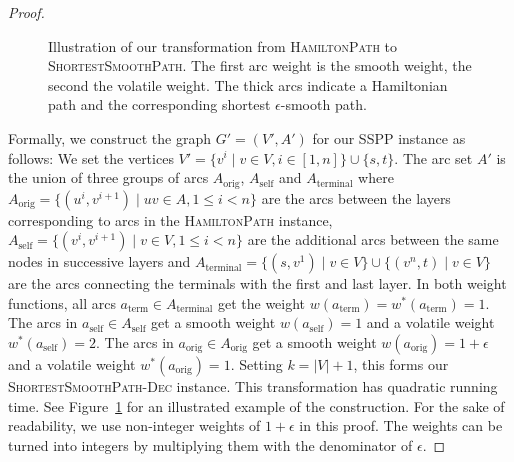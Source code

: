 \documentclass[a4paper,UKenglish,cleveref, autoref, thm-restate]{lipics-v2021}
\begin{document}
\begin{proof}
\begin{figure}
\caption{
Illustration of our transformation from \textsc{HamiltonPath} to \textsc{ShortestSmoothPath}.
The first arc weight is the smooth weight, the second the volatile weight.
The thick arcs indicate a Hamiltonian path and the corresponding shortest $\epsilon$-smooth path.
}
\label{fig:transformation}
\end{figure}

Formally, we construct the graph $G'=(V',A')$ for our SSPP instance as follows:
We set the vertices $V' = \{ v^i \mid v \in V, i \in [1,n] \} \cup \{s,t\}$.
The arc set $A'$ is the union of three groups of arcs $A_{\operatorname{orig}}$, $A_{\operatorname{self}}$ and $A_{\operatorname{terminal}}$ where $A_{\operatorname{orig}} = \{ (u^i, v^{i+1}) \mid uv \in A, 1 \leq i < n \}$ are the arcs between the layers corresponding to arcs in the \textsc{HamiltonPath} instance, $A_{\operatorname{self}} = \{ (v^i, v^{i+1}) \mid v \in V, 1 \leq i < n \}$ are the additional arcs between the same nodes in successive layers and $A_{\operatorname{terminal}} = \{ (s, v^1) \mid v \in V \} \cup \{ (v^n, t) \mid v \in V \}$ are the arcs connecting the terminals with the first and last layer.
In both weight functions, all arcs $a_{\operatorname{term}} \in A_{\operatorname{terminal}}$ get the weight $w(a_{\operatorname{term}}) = w^*(a_{\operatorname{term}}) = 1$.
The arcs in $a_{\operatorname{self}} \in A_{\operatorname{self}}$ get a smooth weight $w(a_{\operatorname{self}}) = 1$ and a volatile weight $w^*(a_{\operatorname{self}}) = 2$.
The arcs in $a_{\operatorname{orig}} \in A_{\operatorname{orig}}$ get a smooth weight $w(a_{\operatorname{orig}}) = 1+\epsilon$ and a volatile weight $w^*(a_{\operatorname{orig}}) = 1$.
Setting $k=|V|+1$, this forms our \textsc{ShortestSmoothPath-Dec} instance.
This transformation has quadratic running time.
See Figure~\ref{fig:transformation} for an illustrated example of the construction.
For the sake of readability, we use non-integer weights of $1+\epsilon$ in this proof.
The weights can be turned into integers by multiplying them with the denominator of $\epsilon$.


\end{proof}
\end{document}

